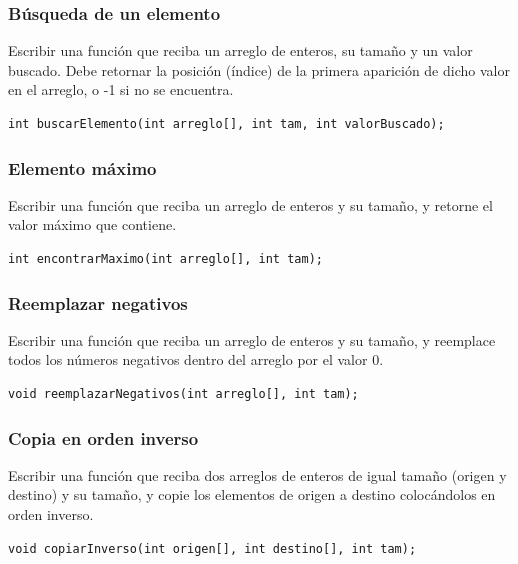 \subsubsection{Búsqueda de un elemento}
Escribir una función que reciba un arreglo de enteros, su tamaño y un valor buscado. Debe retornar la posición (índice) de la primera aparición de dicho valor en el arreglo, o -1 si no se encuentra.
\begin{lstlisting}[style=customc, basicstyle=\ttfamily]
int buscarElemento(int arreglo[], int tam, int valorBuscado);
\end{lstlisting}

\subsubsection{Elemento máximo}
Escribir una función que reciba un arreglo de enteros y su tamaño, y retorne el valor máximo que contiene.
\begin{lstlisting}[style=customc, basicstyle=\ttfamily]
int encontrarMaximo(int arreglo[], int tam);
\end{lstlisting}

\subsubsection{Reemplazar negativos}
Escribir una función que reciba un arreglo de enteros y su tamaño, y reemplace todos los números negativos dentro del arreglo por el valor 0.
\begin{lstlisting}[style=customc, basicstyle=\ttfamily]
void reemplazarNegativos(int arreglo[], int tam);
\end{lstlisting}

\subsubsection{Copia en orden inverso}
Escribir una función que reciba dos arreglos de enteros de igual tamaño (origen y destino) y su tamaño, y copie los elementos de origen a destino colocándolos en orden inverso.
\begin{lstlisting}[style=customc, basicstyle=\ttfamily]
void copiarInverso(int origen[], int destino[], int tam);
\end{lstlisting}

